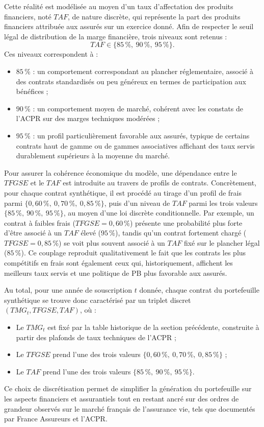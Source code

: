 Cette réalité est modélisée au moyen d'un taux d'affectation des produits financiers, noté $TAF$, de nature discrète, qui représente la part des produits financiers attribuée aux assurés sur un exercice donné. Afin de respecter le seuil légal de distribution de la marge financière, trois niveaux sont retenus :
\[
  TAF \in \{85\,\%,\ 90\,\%,\ 95\,\%\}.
\]
Ces niveaux correspondent à :
\begin{itemize}
  \item $85\,\%$ : un comportement correspondant au plancher réglementaire, associé à des contrats standardisés ou peu généreux en termes de participation aux bénéfices ;
  \item $90\,\%$ : un comportement moyen de marché, cohérent avec les constats de l'ACPR sur des marges techniques modérées ;
  \item $95\,\%$ : un profil particulièrement favorable aux assurés, typique de certains contrats haut de gamme ou de gammes associatives affichant des taux servis durablement supérieurs à la moyenne du marché.
\end{itemize}

Pour assurer la cohérence économique du modèle, une dépendance entre le $TFGSE$ et le $TAF$ est introduite au travers de profils de contrats. Concrètement, pour chaque contrat synthétique, il est procédé au tirage d'un profil de frais parmi $\{0{,}60\,\%,\ 0{,}70\,\%,\ 0{,}85\,\%\}$, puis d'un niveau de $TAF$ parmi les trois valeurs $\{85\,\%,\ 90\,\%,\ 95\,\%\}$, au moyen d'une loi discrète conditionnelle. Par exemple, un contrat à faibles frais ($TFGSE = 0{,}60\,\%$) présente une probabilité plus forte d'être associé à un $TAF$ élevé ($95\,\%$), tandis qu'un contrat fortement chargé ($TFGSE = 0{,}85\,\%$) se voit plus souvent associé à un $TAF$ fixé sur le plancher légal ($85\,\%$). Ce couplage reproduit qualitativement le fait que les contrats les plus compétitifs en frais sont également ceux qui, historiquement, affichent les meilleurs taux servis et une politique de PB plus favorable aux assurés.

Au total, pour une année de souscription $t$ donnée, chaque contrat du portefeuille synthétique se trouve donc caractérisé par un triplet discret $(TMG_t, TFGSE, TAF)$, où :
\begin{itemize}
  \item Le $TMG_t$ est fixé par la table historique de la section précédente, construite à partir des plafonds de taux techniques de l'ACPR ;
  \item Le $TFGSE$ prend l'une des trois valeurs $\{0{,}60\,\%,\ 0{,}70\,\%,\ 0{,}85\,\%\}$ ;
  \item Le $TAF$ prend l'une des trois valeurs $\{85\,\%,\ 90\,\%,\ 95\,\%\}$.
\end{itemize}
Ce choix de discrétisation permet de simplifier la génération du portefeuille sur les aspects financiers et assurantiels tout en restant ancré sur des ordres de grandeur observés sur le marché français de l'assurance vie, tels que documentés par France Assureurs et l'ACPR.

